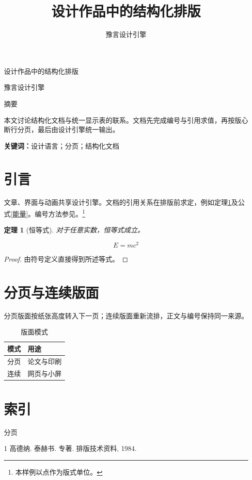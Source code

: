 \documentclass[UTF8,a4paper,11pt,fontset=fandol]{ctexart}
\title{设计作品中的结构化排版}
\author{豫言设计引擎}
\date{}
\newtheorem{定理}{定理}[section]
\numberwithin{equation}{section}
\begin{document}
\begin{center}
{\fontsize{18pt}{24pt}\selectfont 设计作品中的结构化排版}\par
\vspace{4pt}
豫言设计引擎
\end{center}
\noindent 摘要\par
本文讨论结构化文档与统一显示表的联系。文档先完成编号与引用求值，再按版心断行分页，最后由设计引擎统一输出。

\textbf{关键词：}设计语言；分页；结构化文档
\tableofcontents
\section{引言}\label{引言}
文章、界面与动画共享设计引擎。文档的引用关系在排版前求定，例如定理\ref{恒等}及公式\eqref{能量}。编号方法参见\cite{排版}。\footnote{本样例以点作为版式单位。}
\begin{定理}[恒等式]\label{恒等}
对于任意实数，恒等式成立。
\end{定理}
\begin{equation}\label{能量}
E=mc^2
\end{equation}
\begin{proof}
由符号定义直接得到所述等式。
\end{proof}
\clearpage
\section{分页与连续版面}\label{分页节}
分页版面按纸张高度转入下一页；连续版面重新流排，正文与编号保持同一来源。
\begin{table}[ht]
\centering
\caption{版面模式}\label{模式表}
\begin{tabular}{ll}\toprule
模式 & 用途 \\\midrule
分页 & 论文与印刷 \\
连续 & 网页与小屏 \\\bottomrule
\end{tabular}
\end{table}
\section*{索引}
分页
\begin{thebibliography}{1}
 高德纳. 泰赫书. 专著. 排版技术资料, 1984.
\end{thebibliography}
\end{document}
